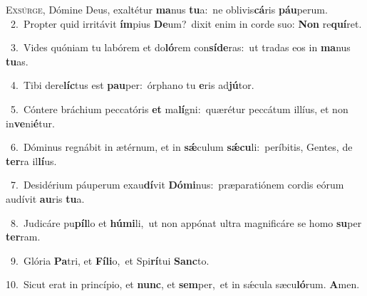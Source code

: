 \lettrine{\initial\textcolor{\initialcolor}{E}}{xsúrge,} Dómine Deus, exaltétur \textbf{ma}\-nus \textbf{tu}\-a:~\star ne oblivis\-\textbf{cá}\-ris \textbf{páu}\-perum.\\
{\numbfont\textcolor{\numbcolor}{~2.}}~Propter quid irritávit \textbf{ím}\-pius \textbf{De}\-um?~\star dixit enim in corde suo: \textbf{Non} re\-\textbf{quí}\-ret.\par
{\numbfont\textcolor{\numbcolor}{~3.}}~Vides quóniam tu labórem et do\-\textbf{ló}\-rem con\-\textbf{sí}\-\textbf{de}ras:~\star ut tradas eos in \textbf{ma}\-nus \textbf{tu}\-as.\par
{\numbfont\textcolor{\numbcolor}{~4.}}~Tibi dere\-\textbf{líc}\-tus est \textbf{pau}\-per:~\star órphano tu \textbf{e}\-ris ad\-\textbf{jú}\-tor.\par
{\numbfont\textcolor{\numbcolor}{~5.}}~Cóntere bráchium peccatóris \textbf{et} ma\-\textbf{lí}\-gni:~\star quærétur peccátum illíus, et non in\-\textbf{ve}\-ni\-\textbf{é}\-tur.\par
{\numbfont\textcolor{\numbcolor}{~6.}}~Dóminus regnábit in ætérnum, et in \textbf{sǽ}\-culum \textbf{sǽ}\-\textbf{cu}li:~\star períbitis, Gentes, de \textbf{ter}\-ra il\-\textbf{lí}\-us.\par
{\numbfont\textcolor{\numbcolor}{~7.}}~Desidérium páuperum exau\-\textbf{dí}\-vit \textbf{Dó}\-\textbf{mi}nus:~\star præparatiónem cordis eórum audívit \textbf{au}\-ris \textbf{tu}\-a.\par
{\numbfont\textcolor{\numbcolor}{~8.}}~Judicáre pu\-\textbf{píl}\-lo et \textbf{hú}\-\textbf{mi}li,~\star ut non appónat ultra magnificáre se homo \textbf{su}\-per \textbf{ter}\-ram.\par
{\numbfont\textcolor{\numbcolor}{~9.}}~Glória \textbf{Pa}\-tri, et \textbf{Fí}\-\textbf{li}o,~\star et Spi\-\textbf{rí}\-tui \textbf{Sanc}\-to.\par
{\numbfont\textcolor{\numbcolor}{10.}}~Sicut erat in princípio, et \textbf{nunc}\-, et \textbf{sem}\-per,~\star et in sǽcula sæcu\-\textbf{ló}\-rum. \textbf{A}\-men.\par

